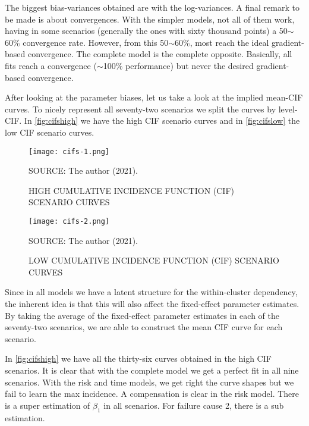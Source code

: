 The biggest bias-variances obtained are with the log-variances. A final
remark to be made is about convergences. With the simpler models, not
all of them work, having in some scenarios (generally the ones with
sixty thousand points) a 50\(\sim\)60\% convergence rate. However, from
this 50\(\sim\)60\%, most reach the ideal gradient-based
convergence. The complete model is the complete opposite. Basically, all
fits reach a convergence (\(\sim\)100\% performance) but never the
desired gradient-based convergence.

After looking at the parameter biases, let us take a look at the implied
mean-CIF curves. To nicely represent all seventy-two scenarios we split
the curves by level-CIF. In \autoref{fig:cifshigh} we have the high CIF
scenario curves and in \autoref{fig:cifslow} the low CIF scenario
curves.

\begin{figure}[H]
 \setlength{\abovecaptionskip}{.0001pt}
 \caption{HIGH CUMULATIVE INCIDENCE FUNCTION (CIF) SCENARIO CURVES}
 \vspace{0.2cm}\centering
 \texttt{[image: cifs-1.png]}\\
 \begin{footnotesize}
  SOURCE: The author (2021).
 \end{footnotesize}
 \label{fig:cifshigh}
\end{figure}

\begin{figure}[H]
 \setlength{\abovecaptionskip}{.0001pt}
 \caption{LOW CUMULATIVE INCIDENCE FUNCTION (CIF) SCENARIO CURVES}
 \vspace{0.2cm}\centering
 \texttt{[image: cifs-2.png]}\\
 \begin{footnotesize}
  SOURCE: The author (2021).
 \end{footnotesize}
 \label{fig:cifslow}
\end{figure}

Since in all models we have a latent structure for the within-cluster
dependency, the inherent idea is that this will also affect the
fixed-effect parameter estimates. By taking the average of the
fixed-effect parameter estimates in each of the seventy-two scenarios,
we are able to construct the mean CIF curve for each scenario.

In \autoref{fig:cifshigh} we have all the thirty-six curves obtained in
the high CIF scenarios. It is clear that with the complete model we get
a perfect fit in all nine scenarios. With the risk and time models, we
get right the curve shapes but we fail to learn the max incidence. A
compensation is clear in the risk model. There is a super estimation of
\(\beta_{1}\) in all scenarios. For failure cause 2, there is a sub
estimation.

